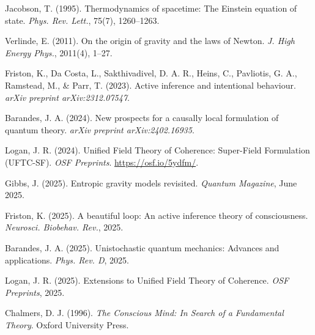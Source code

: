 \documentclass[12pt]{book}
\theoremstyle{definition}
\begin{document}

\begin{thebibliography}{10}

Jacobson, T. (1995).
Thermodynamics of spacetime: The Einstein equation of state.
\emph{Phys. Rev. Lett.}, 75(7), 1260--1263.

Verlinde, E. (2011).
On the origin of gravity and the laws of Newton.
\emph{J. High Energy Phys.}, 2011(4), 1--27.

Friston, K., Da Costa, L., Sakthivadivel, D. A. R., Heins, C., Pavliotis, G. A., Ramstead, M., \& Parr, T. (2023).
Active inference and intentional behaviour.
\emph{arXiv preprint arXiv:2312.07547}.

Barandes, J. A. (2024).
New prospects for a causally local formulation of quantum theory.
\emph{arXiv preprint arXiv:2402.16935}.

Logan, J. R. (2024).
Unified Field Theory of Coherence: Super-Field Formulation (UFTC-SF).
\emph{OSF Preprints}.
\url{https://osf.io/5ydfm/}.

Gibbs, J. (2025).
Entropic gravity models revisited.
\emph{Quantum Magazine}, June 2025.

Friston, K. (2025).
A beautiful loop: An active inference theory of consciousness.
\emph{Neurosci. Biobehav. Rev.}, 2025.

Barandes, J. A. (2025).
Unistochastic quantum mechanics: Advances and applications.
\emph{Phys. Rev. D}, 2025.

Logan, J. R. (2025).
Extensions to Unified Field Theory of Coherence.
\emph{OSF Preprints}, 2025.

Chalmers, D. J. (1996).
\emph{The Conscious Mind: In Search of a Fundamental Theory}.
Oxford University Press.

\end{thebibliography}
\end{document}
